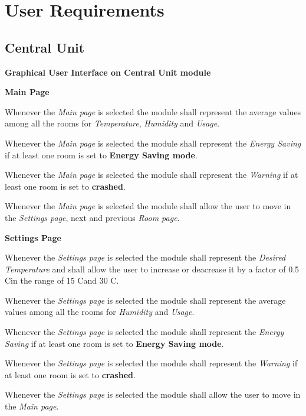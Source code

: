 \section{User Requirements}
	\subsection{Central Unit}
		\begin{req_enum}
			\item \textbf{Graphical User Interface on Central Unit module}
			\begin{req_enum}[label*=\arabic*.]
				\item \textbf{Main Page}
					\begin{req_enum}[label*=\arabic*.]
						\item Whenever the \textit{Main page} is selected the module shall represent the average values among all the rooms for \textit{Temperature}, \textit{Humidity} and \textit{Usage}.\\
						\item Whenever the \textit{Main page} is selected the module shall represent the \textit{Energy Saving} if at least one room is set to \textbf{Energy Saving mode}.\\
						\item Whenever the \textit{Main page} is selected the module shall represent the \textit{Warning} if at least one room is set to \textbf{crashed}.\\
						\item Whenever the \textit{Main page} is selected the module shall allow the user to move in the \textit{Settings page}, next and previous \textit{Room page}.\\
					\end{req_enum}
				\item \textbf{Settings Page}
					\begin{req_enum}[label*=\arabic*.]
						\item Whenever the \textit{Settings page} is selected the module shall represent the \textit{Desired Temperature} and shall allow the user to increase or deacrease it by a factor of 0.5 C\degree in the range of 15 C\degree and 30 C\degree.\\
						\item Whenever the \textit{Settings page} is selected the module shall represent the average values among all the rooms for \textit{Humidity} and \textit{Usage}.\\
						\item Whenever the \textit{Settings page} is selected the module shall represent the \textit{Energy Saving} if at least one room is set to \textbf{Energy Saving mode}.\\
						\item Whenever the \textit{Settings page} is selected the module shall represent the \textit{Warning} if at least one room is set to \textbf{crashed}.\\
						\item Whenever the \textit{Settings page} is selected the module shall allow the user to move in the \textit{Main page}.\\
					\end{req_enum}


\end{req_enum}
\end{req_enum}
